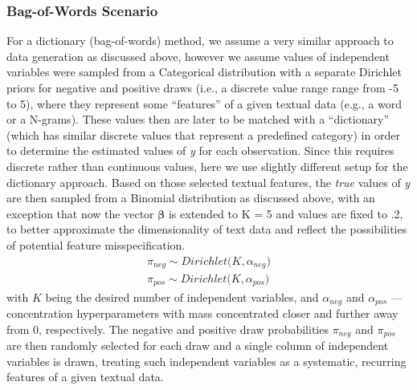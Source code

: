 \documentclass[man, 12pt, a4paper, nolmodern, noextraspace]{apa6}
\begin{document}
    \subsubsection{Bag-of-Words Scenario}
     For a dictionary (bag-of-words) method, we assume a very similar approach to data generation as discussed above, however we assume values of independent variables were sampled from a Categorical distribution with a separate Dirichlet priors for negative and positive draws (i.e., a discrete value range range from -5 to 5), where they represent some \enquote{features} of a given textual data (e.g., a word or a N-grams). These values then are later to be matched with a \enquote{dictionary} (which has similar discrete values that represent a predefined category) in order to determine the estimated values of \textit{y} for each observation. Since this requires discrete rather than continuous values, here we use slightly different setup for the dictionary approach. Based on those selected textual features, the \textit{true} values of \textit{y} are then sampled from a Binomial distribution as discussed above, with an exception that now the vector $\boldsymbol{\beta}$ is extended to K = 5 and values are fixed to .2, to better approximate the dimensionality of text data and reflect the possibilities of potential feature misspecification.
       \begin{equation}
        \begin{gathered}
%        
%
%
        \pi_{neg} \sim Dirichlet\bigl(K, \alpha_{neg}\bigr) \\
        \pi_{pos} \sim Dirichlet\bigl(K, \alpha_{pos}\bigr)
        \end{gathered}
    \end{equation}
    \noindent with $K$ being the desired number of independent variables, and $\alpha_{neg}$ and $\alpha_{pos}$ --- concentration hyperparameters with mass concentrated closer and further away from 0, respectively. The negative and positive draw probabilities $\pi_{neg}$ and $\pi_{pos}$ are then randomly selected for each draw and a single column of independent variables is drawn, treating such independent variables as a systematic, recurring features of a given textual data. 
\end{document}
